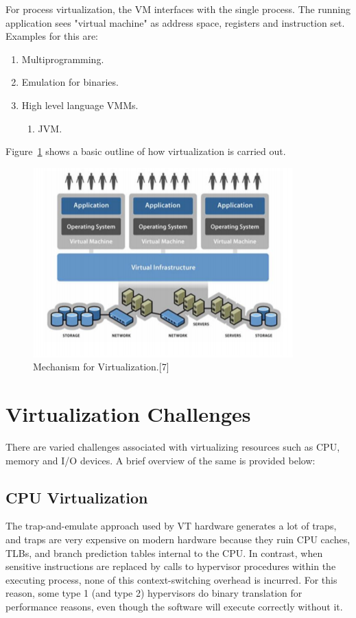 For process virtualization, the VM interfaces with the single process. The running application sees "virtual machine" as address space, registers and instruction set. Examples for this are:
\begin{enumerate}
\item Multiprogramming.
\item Emulation for binaries.
\item High level language VMMs.
      \begin{enumerate}
      \item JVM.
      \end{enumerate}
\end{enumerate}
Figure~\ref{fig:one} shows a basic outline of how virtualization is carried out.
%
\begin{figure}
  \includegraphics{snip}
  \caption{Mechanism for Virtualization.[7]}
  \label{fig:one}
\end{figure}


\section{Virtualization Challenges}
There are varied challenges associated with virtualizing resources such as CPU, memory and I/O devices. A brief overview of the same is provided below:
\subsection{CPU Virtualization}
\label{sec:vir}
The trap-and-emulate approach used
by VT hardware generates a lot of traps, and traps are very expensive on modern
hardware because they ruin CPU caches, TLBs, and branch prediction tables internal
to the CPU. In contrast, when sensitive instructions are replaced by calls to
hypervisor procedures within the executing process, none of this context-switching
overhead is incurred.  For this reason, some type 1 (and type 2)
hypervisors do binary translation for performance reasons, even though the software
will execute correctly without it.

